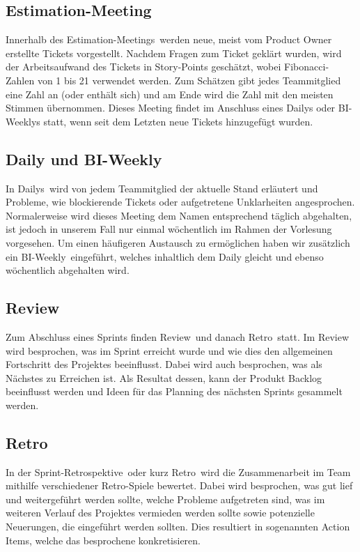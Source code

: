 \subsection{Estimation-Meeting}
Innerhalb des \glqq Estimation-Meetings\grqq~werden neue, meist vom Product Owner erstellte Tickets vorgestellt. Nachdem Fragen zum Ticket
geklärt wurden, wird der Arbeitsaufwand des Tickets in Story-Points geschätzt, wobei Fibonacci-Zahlen von 1 bis 21 verwendet werden. Zum Schätzen
gibt jedes Teammitglied eine Zahl an (oder enthält sich) und am Ende wird die Zahl mit den meisten Stimmen übernommen. 
Dieses Meeting findet im Anschluss eines Dailys oder BI-Weeklys statt, wenn seit dem Letzten neue Tickets hinzugefügt wurden.

\subsection{Daily und BI-Weekly}
In \glqq Dailys\grqq~wird von jedem Teammitglied der aktuelle Stand erläutert und Probleme, wie blockierende Tickets oder aufgetretene 
Unklarheiten angesprochen. Normalerweise wird dieses Meeting dem Namen entsprechend täglich abgehalten, ist jedoch in unserem Fall nur einmal 
wöchentlich im Rahmen der Vorlesung vorgesehen. Um einen häufigeren Austausch zu ermöglichen haben wir zusätzlich ein 
\glqq BI-Weekly\grqq~eingeführt, welches inhaltlich dem Daily gleicht und ebenso wöchentlich abgehalten wird.

\subsection{Review}
Zum Abschluss eines Sprints finden \glqq Review\grqq~und danach \glqq Retro\grqq~statt. Im Review wird besprochen, was im Sprint erreicht 
wurde und wie dies den allgemeinen Fortschritt des Projektes beeinflusst. Dabei wird auch besprochen, was als Nächstes zu Erreichen ist. 
Als Resultat dessen, kann der Produkt Backlog beeinflusst werden und Ideen für das Planning des nächsten Sprints gesammelt werden. 

\subsection{Retro}
In der \glqq Sprint-Retrospektive\grqq~oder kurz \glqq Retro\grqq~wird die Zusammenarbeit im Team mithilfe verschiedener Retro-Spiele bewertet. 
Dabei wird besprochen, was gut lief und weitergeführt werden sollte, welche Probleme aufgetreten sind, was im weiteren Verlauf des Projektes 
vermieden werden sollte sowie potenzielle Neuerungen, die eingeführt werden sollten. Dies resultiert in sogenannten Action Items, welche das 
besprochene konkretisieren.
